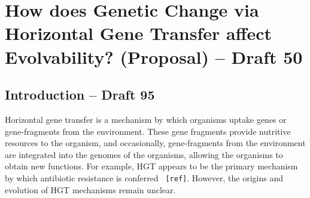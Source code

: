 \section{How does Genetic Change via Horizontal Gene Transfer affect Evolvability? (Proposal) – Draft 50}
\subsection{Introduction – Draft 95}

Horizontal gene transfer is a mechanism by which organisms uptake genes or gene-fragments from the environment.  These gene fragments provide nutritive resources to the organism, and occasionally, gene-fragments from the environment are integrated into the genomes of the organisms, allowing the organisms to obtain new functions. For example, HGT appears to be the primary mechanism by which antibiotic resistance is conferred \verb| [ref]|. However, the origins and evolution of HGT mechanisms remain unclear. 